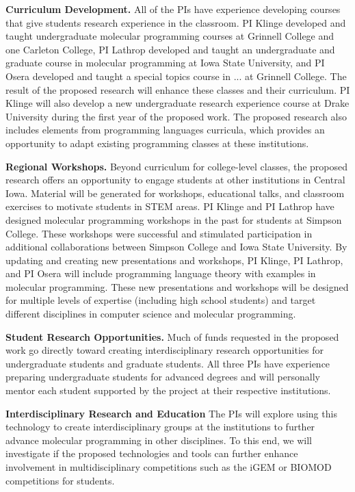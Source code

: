 \textbf{Curriculum Development.}
All of the PIs have experience developing courses that give students research experience in the classroom.
PI Klinge developed and taught undergraduate molecular programming courses at Grinnell College and one Carleton College, PI Lathrop developed and taught an undergraduate and graduate course in molecular programming at Iowa State University, and PI Osera developed and taught a special topics course in ... at Grinnell College.
The result of the proposed research will enhance these classes and their curriculum.
PI Klinge will also develop a new undergraduate research experience course at Drake University during the first year of the proposed work.
The proposed research also includes elements from programming languages curricula, which provides an opportunity to adapt existing programming classes at these institutions.

\textbf{Regional Workshops.}
Beyond curriculum for college-level classes, the proposed research offers an opportunity to engage students at other institutions in Central Iowa.
Material will be generated for workshops, educational talks, and classroom exercises to  motivate students in STEM areas.
PI Klinge and PI Lathrop have designed molecular programming workshops in the past for students at Simpson College.
These workshops were successful and stimulated participation in additional collaborations between Simpson College and Iowa State University.
By updating and creating new presentations and workshops, PI Klinge, PI Lathrop, and PI Osera will include programming language theory with examples in molecular programming.
These new presentations and workshops will be designed for multiple levels of expertise (including high school students) and target different disciplines in computer science and molecular programming.

\textbf{Student Research Opportunities.}
Much of funds requested in the proposed work go directly toward creating interdisciplinary research opportunities for undergraduate students and graduate students.
All three PIs have experience preparing undergraduate students for advanced degrees and will personally mentor each student supported by the project at their respective institutions.

\textbf{Interdisciplinary Research and Education}
The PIs will explore using this technology to create interdisciplinary groups at the institutions to further advance molecular programming in other disciplines.
To this end, we will investigate if the proposed technologies and tools can further enhance involvement in multidisciplinary competitions such as the iGEM or BIOMOD competitions for students.
